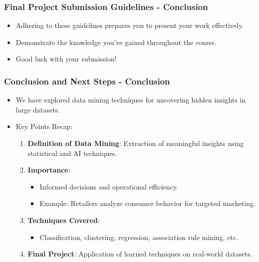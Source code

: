\documentclass[aspectratio=169]{beamer}
\begin{document}
\begin{frame}[fragile]
    \frametitle{Final Project Submission Guidelines - Conclusion}
    \begin{itemize}
        \item Adhering to these guidelines prepares you to present your work effectively.
        \item Demonstrate the knowledge you've gained throughout the course.
        \item Good luck with your submission!
    \end{itemize}
\end{frame}

\begin{frame}[fragile]
    \frametitle{Conclusion and Next Steps - Conclusion}
    \begin{itemize}
        \item We have explored data mining techniques for uncovering hidden insights in large datasets.
        \item Key Points Recap:
        \begin{enumerate}
            \item \textbf{Definition of Data Mining}: Extraction of meaningful insights using statistical and AI techniques.
            \item \textbf{Importance}:
                \begin{itemize}
                    \item Informed decisions and operational efficiency.
                    \item Example: Retailers analyze consumer behavior for targeted marketing.
                \end{itemize}
            \item \textbf{Techniques Covered}:
                \begin{itemize}
                    \item Classification, clustering, regression, association rule mining, etc.
                \end{itemize}
            \item \textbf{Final Project}: Application of learned techniques on real-world datasets.
        \end{enumerate}
    \end{itemize}
\end{frame}
\end{document}
